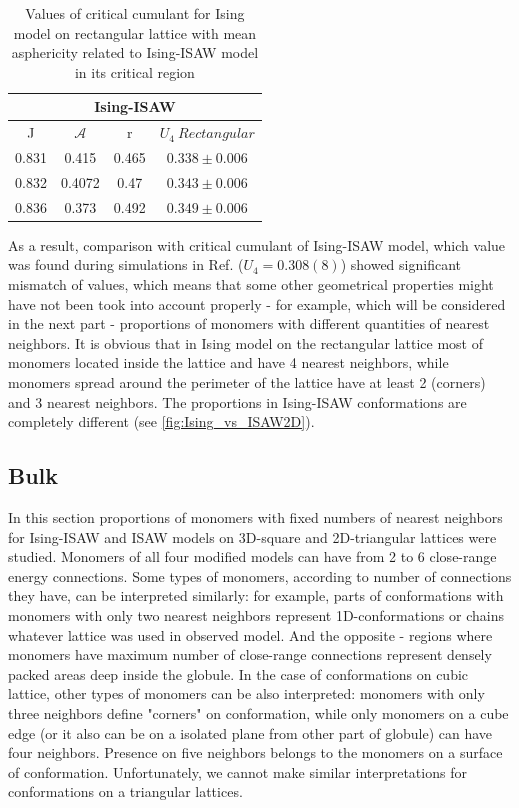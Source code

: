 \begin{table}[h]
    \centering
    \begin{tabular}{|c|c|c|c|}
        \hline
         \multicolumn{4}{|c|}{Ising-ISAW}  \\ \hline
         J & $\mathcal{A}$ & r & $U_{4}\  Rectangular$ \\ \hline
         0.831 & 0.415 & 0.465 & $0.338 \pm 0.006$\\ \hline
         0.832 & 0.4072 & 0.47 & $0.343 \pm 0.006$\\ \hline
         0.836 & 0.373 & 0.492 & $0.349 \pm 0.006$\\ \hline
         \end{tabular}
    \medskip
    \caption{Values of critical cumulant for Ising model on rectangular lattice with mean asphericity related to Ising-ISAW model in its critical region}
    \label{tab:A_r_U}
\end{table}


As a result, comparison with critical cumulant of Ising-ISAW model, which value was found during simulations in Ref.\cite{faizullina2021critical} ($U_{4} = 0.308(8)$) showed significant mismatch of values, which means that some other geometrical properties might have not been took into account properly - for example, which will be considered in the next part - proportions of monomers with different quantities of nearest neighbors. It is obvious that in Ising model on the rectangular lattice most of monomers located inside the lattice and have 4 nearest neighbors, while monomers spread around the perimeter of the lattice have at least 2 (corners) and 3 nearest neighbors. The proportions in Ising-ISAW conformations are completely different (see \cref{fig:Ising_vs_ISAW2D}).



\subsection{Bulk}

In this section proportions of monomers with fixed numbers of nearest neighbors for Ising-ISAW and ISAW models on 3D-square and 2D-triangular lattices were studied. 
Monomers of all four modified models can have from 2 to 6 close-range energy connections. 
Some types of monomers, according to number of connections they have, can be interpreted similarly: for example, parts of conformations with monomers with only two nearest neighbors represent 1D-conformations or chains whatever lattice was used in observed model. 
And the opposite - regions where monomers have maximum number of close-range connections represent densely packed areas deep inside the globule. 
In the case of conformations on cubic lattice, other types of monomers can be also interpreted: monomers with only three neighbors define "corners" on conformation, while only monomers on a cube edge (or it also can be on a isolated plane from other part of globule) can have four neighbors. 
Presence on five neighbors belongs to the monomers on a surface of conformation. 
Unfortunately, we cannot make similar interpretations for conformations on a triangular lattices.

